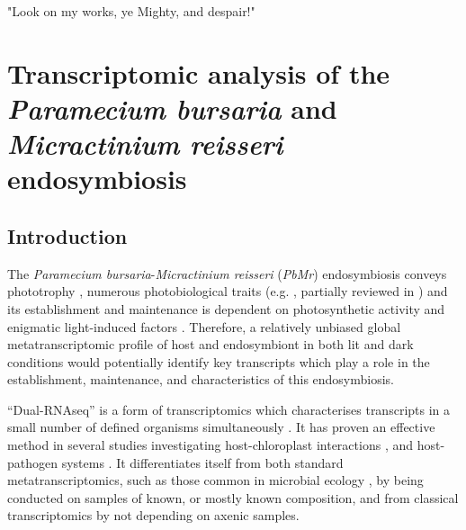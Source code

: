\graphicspath{{chapters/4.Chapter_2/figures/}}

\begin{savequote}[75mm]
"Look on my works, ye Mighty, and despair!"
\end{savequote}

\chapter{Transcriptomic analysis of the \textit{Paramecium bursaria} and \textit{Micractinium reisseri} endosymbiosis}


\section{Introduction}

The \textit{Paramecium bursaria}-\textit{Micractinium reisseri} (\textit{PbMr}) endosymbiosis 
conveys phototrophy \citep{Karakashian1963}, numerous photobiological traits (e.g. \citep{Berk1991,Saji1974,Nakajima1989,Niess1982a,Iwatsuki1988,Summerer2009}, 
partially reviewed in \citep{Sommaruga2009}) and its establishment and maintenance 
is dependent on photosynthetic activity and enigmatic light-induced factors \citep{Karakashian1963,Hosoya1995a,Kodama2007,Kodama2014c}.
Therefore, a relatively unbiased global metatranscriptomic profile of host and endosymbiont in both lit and dark conditions 
would potentially identify key transcripts which play a role in the establishment, maintenance, and characteristics 
of this endosymbiosis. 


``Dual-RNAseq'' is a form of transcriptomics which characterises transcripts in a small number of defined organisms simultaneously \citep{Westermann2012}.
It has proven an effective method in several studies investigating host-chloroplast interactions \citep{Nowack2011,Jiggins2013,Xiang2015},
and host-pathogen systems \citep{Tierney2012,Kawahara2012,Jones2014,Hayden2014}.
It differentiates itself from both standard metatranscriptomics, such as those common in microbial ecology \citep{Poretsky2005,AliagaGoltsman2014},
by being conducted on samples of known, or mostly known composition, and from classical transcriptomics
by not depending on axenic samples. 



